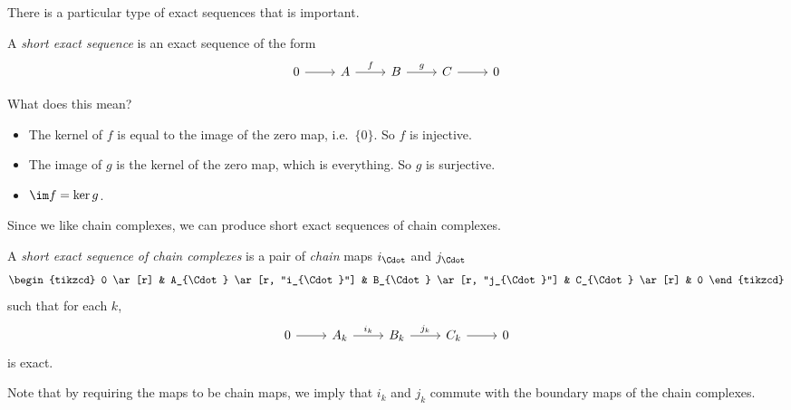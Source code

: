\documentclass[a4paper]{article}
\begin{document}
There is a particular type of exact sequences that is important.

\begin{defi}
  A \emph{short exact sequence} is an exact sequence of the form
  \[
    \begin{tikzcd}
      0 \ar [r] & A \ar [r, "f"] & B \ar [r, "g"] & C \ar[r] & 0
    \end{tikzcd}
  \]
\end{defi}
What does this mean?
\begin{itemize}
  \item The kernel of $f$ is equal to the image of the zero map, i.e.\ $\{0\}$. So $f$ is injective.
  \item The image of $g$ is the kernel of the zero map, which is everything. So $g$ is surjective.
  \item $\im f = \ker g$.
\end{itemize}

Since we like chain complexes, we can produce short exact sequences of chain complexes.
\begin{defi}
  A \emph{short exact sequence of chain complexes} is a pair of \emph{chain} maps $i_{\Cdot}$ and $j_{\Cdot}$
  \[
    \begin{tikzcd}
      0 \ar[r] & A_{\Cdot} \ar [r, "i_{\Cdot}"] & B_{\Cdot} \ar [r, "j_{\Cdot}"] & C_{\Cdot} \ar[r] & 0
    \end{tikzcd}
  \]
  such that for each $k$,
  \[
    \begin{tikzcd}
      0 \ar[r] & A_k \ar [r, "i_k"] & B_k \ar [r, "j_k"] & C_k \ar[r] & 0
    \end{tikzcd}
  \]
  is exact.
\end{defi}
Note that by requiring the maps to be chain maps, we imply that $i_k$ and $j_k$ commute with the boundary maps of the chain complexes.
\end{document}
